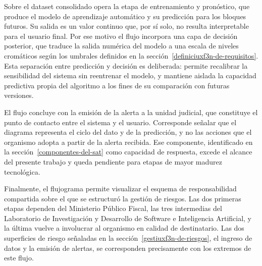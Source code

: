 Sobre el dataset consolidado opera la etapa de entrenamiento y pronóstico, que produce el modelo de aprendizaje automático y su predicción para los bloques futuros. Su salida es un valor continuo que, por sí solo, no resulta interpretable para el usuario final. Por ese motivo el flujo incorpora una capa de decisión posterior, que traduce la salida numérica del modelo a una escala de niveles cromáticos según los umbrales definidos en la sección~\ref{definiciuxf3n-de-requisitos}. Esta separación entre predicción y decisión es deliberada: permite recalibrar la sensibilidad del sistema sin reentrenar el modelo, y mantiene aislada la capacidad predictiva propia del algoritmo a los fines de su comparación con futuras versiones.

El flujo concluye con la emisión de la alerta a la unidad judicial, que constituye el punto de contacto entre el sistema y el usuario. Corresponde señalar que el diagrama representa el ciclo del dato y de la predicción, y no las acciones que el organismo adopta a partir de la alerta recibida. Ese componente, identificado en la sección~\ref{componentes-del-sat} como capacidad de respuesta, excede el alcance del presente trabajo y queda pendiente para etapas de mayor madurez tecnológica.

Finalmente, el flujograma permite visualizar el esquema de responsabilidad compartida sobre el que se estructuró la gestión de riesgos. Las dos primeras etapas dependen del Ministerio Público Fiscal, las tres intermedias del Laboratorio de Investigación y Desarrollo de Software e Inteligencia Artificial, y la última vuelve a involucrar al organismo en calidad de destinatario. Las dos superficies de riesgo señaladas en la sección~\ref{gestiuxf3n-de-riesgos}, el ingreso de datos y la emisión de alertas, se corresponden precisamente con los extremos de este flujo.
